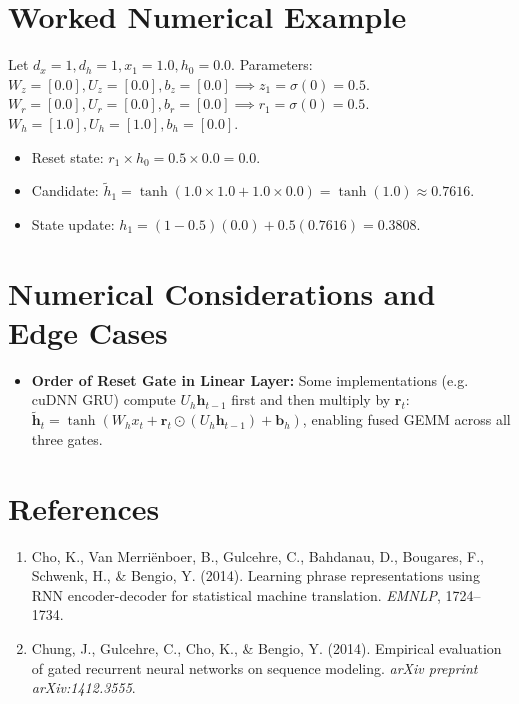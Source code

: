 \documentclass[11pt,a4paper]{article}
\theoremstyle{definition}
\begin{document}
\section{Worked Numerical Example}

Let $d_x = 1, d_h = 1, x_1 = 1.0, h_0 = 0.0$.
Parameters:
$W_z = [0.0], U_z = [0.0], b_z = [0.0] \implies z_1 = \sigma(0) = 0.5$.
$W_r = [0.0], U_r = [0.0], b_r = [0.0] \implies r_1 = \sigma(0) = 0.5$.
$W_h = [1.0], U_h = [1.0], b_h = [0.0]$.
\begin{itemize}
    \item Reset state: $r_1 \times h_0 = 0.5 \times 0.0 = 0.0$.
    \item Candidate: $\tilde{h}_1 = \tanh(1.0 \times 1.0 + 1.0 \times 0.0) = \tanh(1.0) \approx 0.7616$.
    \item State update: $h_1 = (1 - 0.5)(0.0) + 0.5(0.7616) = 0.3808$.
\end{itemize}

\section{Numerical Considerations and Edge Cases}

\begin{itemize}
    \item \textbf{Order of Reset Gate in Linear Layer:} Some implementations (e.g. cuDNN GRU) compute $U_h \mathbf{h}_{t-1}$ first and then multiply by $\mathbf{r}_t$: $\tilde{\mathbf{h}}_t = \tanh(W_h x_t + \mathbf{r}_t \odot (U_h \mathbf{h}_{t-1}) + \mathbf{b}_h)$, enabling fused GEMM across all three gates.
\end{itemize}

\section{References}
\begin{enumerate}
    \item Cho, K., Van Merri{\"e}nboer, B., Gulcehre, C., Bahdanau, D., Bougares, F., Schwenk, H., & Bengio, Y. (2014). Learning phrase representations using RNN encoder-decoder for statistical machine translation. \emph{EMNLP}, 1724--1734.
    \item Chung, J., Gulcehre, C., Cho, K., & Bengio, Y. (2014). Empirical evaluation of gated recurrent neural networks on sequence modeling. \emph{arXiv preprint arXiv:1412.3555}.
\end{enumerate}
\end{document}
